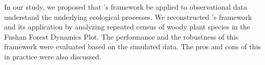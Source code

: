 In our study, we proposed that \citeauthor{guzman2022accounting}'s framework \DIFdelbegin {}\DIFdelend \DIFaddbegin {}\DIFaddend be applied to observational data \DIFdelbegin {}\DIFdelend \DIFaddbegin {}\DIFaddend understand the underlying ecological processes. We reconstructed \citeauthor{guzman2022accounting}'s framework and \DIFdelbegin {}\DIFdelend \DIFaddbegin {}\DIFaddend its application by analyzing repeated census of woody plant species in the Fushan Forest Dynamics Plot. The performance and the robustness of this framework were evaluated based on the simulated data. The pros and cons of this \DIFdelbegin {}\DIFdelend \DIFaddbegin {}\DIFaddend in practice were also discussed.


